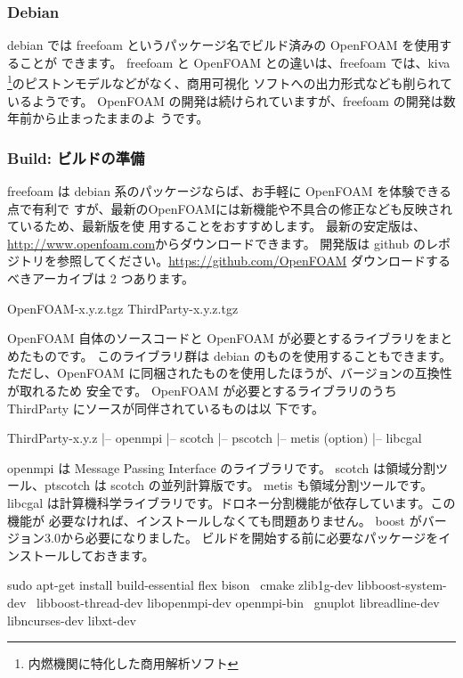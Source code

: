 \documentclass[mingoth,a4paper]{jsarticle}
\begin{document}
\subsubsection{Debian}
debian では freefoam というパッケージ名でビルド済みの OpenFOAM を使用することが
できます。
freefoam と OpenFOAM との違いは、freefoam では、kiva%
\footnote{内燃機関に特化した商用解析ソフト}のピストンモデルなどがなく、商用可視化
ソフトへの出力形式なども削られているようです。
OpenFOAM の開発は続けられていますが、freefoam の開発は数年前から止まったままのよ
うです。

\subsubsection{Build: ビルドの準備}
freefoam は debian 系のパッケージならば、お手軽に OpenFOAM を体験できる点で有利で
すが、最新のOpenFOAMには新機能や不具合の修正なども反映されているため、最新版を使
用することをおすすめします。
最新の安定版は、\url{http://www.openfoam.com}からダウンロードできます。
開発版は github のレポジトリを参照してください。\url{https://github.com/OpenFOAM}
ダウンロードするべきアーカイブは 2 つあります。

\begin{commandline}
OpenFOAM-x.y.z.tgz
ThirdParty-x.y.z.tgz
\end{commandline}

OpenFOAM 自体のソースコードと OpenFOAM が必要とするライブラリをまとめたものです。
このライブラリ群は debian のものを使用することもできます。
ただし、OpenFOAM に同梱されたものを使用したほうが、バージョンの互換性が取れるため
安全です。
OpenFOAM が必要とするライブラリのうち ThirdParty にソースが同伴されているものは以
下です。

\begin{commandline}
ThirdParty-x.y.z
 |-- openmpi
 |-- scotch
 |-- pscotch
 |-- metis (option)
 |-- libcgal
\end{commandline}

openmpi は Message Passing Interface のライブラリです。
scotch は領域分割ツール、ptscotch は scotch の並列計算版です。
metis も領域分割ツールです。
libcgal は計算機科学ライブラリです。ドロネー分割機能が依存しています。この機能が
必要なければ、インストールしなくても問題ありません。
boost がバージョン3.0から必要になりました。
ビルドを開始する前に必要なパッケージをインストールしておきます。

\begin{commandline}
sudo apt-get install build-essential flex bison \
	cmake zlib1g-dev libboost-system-dev \
	libboost-thread-dev libopenmpi-dev openmpi-bin \
	gnuplot libreadline-dev libncurses-dev libxt-dev
\end{commandline}
\end{document}
